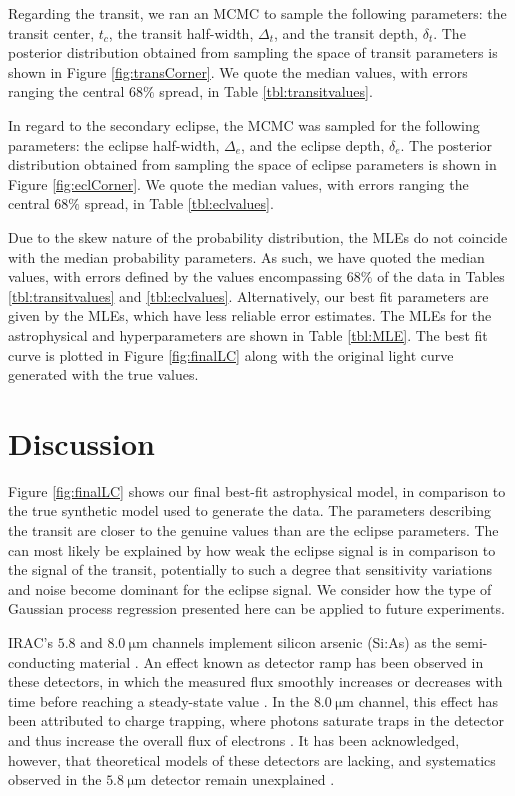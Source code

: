 \documentclass[twocolumn]{aastex61}
\begin{document}
\label{sec:results}
Regarding the transit, we ran an MCMC to sample the following parameters: the transit center, $t_c$, the transit half-width, $\Delta_{t}$, and the transit depth, $\delta_{t}$. The posterior distribution obtained from sampling the space of transit parameters is shown in Figure \ref{fig:transCorner}. We quote the median values, with errors ranging the central $68\%$ spread, in Table \ref{tbl:transitvalues}.

In regard to the secondary eclipse, the MCMC was sampled for the following parameters: the eclipse half-width, $\Delta_{e}$, and the eclipse depth, $\delta_{e}$. The posterior distribution obtained from sampling the space of eclipse parameters is shown in Figure \ref{fig:eclCorner}. We quote the median values, with errors ranging the central $68\%$ spread, in Table \ref{tbl:eclvalues}.

Due to the skew nature of the probability distribution, the MLEs do not coincide with the median probability parameters. As such, we have quoted the median values, with errors defined by the values encompassing $68\%$ of the data in Tables \ref{tbl:transitvalues} and \ref{tbl:eclvalues}. Alternatively, our best fit parameters are given by the MLEs, which have less reliable error estimates. The MLEs for the astrophysical and hyperparameters are shown in Table \ref{tbl:MLE}. The best fit curve is plotted in Figure \ref{fig:finalLC} along with the original light curve generated with the true values.

\section{Discussion}
\label{sec:discussion}
Figure \ref{fig:finalLC} shows our final best-fit astrophysical model, in comparison to the true synthetic model used to generate the data. The parameters describing the transit are closer to the genuine values than are the eclipse parameters. The can most likely be explained by how weak the eclipse signal is in comparison to the signal of the transit, potentially to such a degree that sensitivity variations and noise become dominant for the eclipse signal. We consider how the type of Gaussian process regression presented here can be applied to future experiments. 

IRAC's $5.8$ and $8.0~\mathrm{\mu m}$ channels implement silicon arsenic (Si:As) as the semi-conducting material \citep{evans2015}. An effect known as detector ramp has been observed in these detectors, in which the measured flux smoothly increases or decreases with time before reaching a steady-state value \citep{evans2015}. In the $8.0~\mathrm{\mu m}$ channel, this effect has been attributed to charge trapping, where photons saturate traps in the detector and thus increase the overall flux of electrons \citep{knutson2009}. It has been acknowledged, however, that theoretical models of these detectors are lacking, and systematics observed in the $5.8~\mathrm{\mu m}$ detector remain unexplained \citep{seager2010}.
\end{document}
